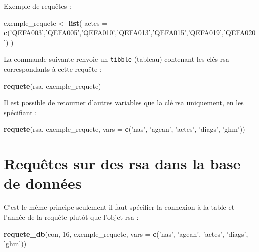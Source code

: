 \documentclass[]{book}
\newenvironment{Shaded}{\begin{snugshade}}{\end{snugshade}}
\newcommand{\DataTypeTok}[1]{\textcolor[rgb]{0.13,0.29,0.53}{#1}}
\newcommand{\DecValTok}[1]{\textcolor[rgb]{0.00,0.00,0.81}{#1}}
\newcommand{\KeywordTok}[1]{\textcolor[rgb]{0.13,0.29,0.53}{\textbf{#1}}}
\newcommand{\NormalTok}[1]{#1}
\newcommand{\StringTok}[1]{\textcolor[rgb]{0.31,0.60,0.02}{#1}}
\begin{document}
Exemple de requêtes :

\begin{Shaded}
\begin{Highlighting}[]
\NormalTok{exemple_requete <-}\StringTok{ }\KeywordTok{list}\NormalTok{(}
  \DataTypeTok{actes =} \KeywordTok{c}\NormalTok{(}\StringTok{'QEFA003'}\NormalTok{,}\StringTok{'QEFA005'}\NormalTok{,}\StringTok{'QEFA010'}\NormalTok{,}\StringTok{'QEFA013'}\NormalTok{,}\StringTok{'QEFA015'}\NormalTok{,}\StringTok{'QEFA019'}\NormalTok{,}\StringTok{'QEFA020'}\NormalTok{)}
\NormalTok{)}
\end{Highlighting}
\end{Shaded}

La commande suivante renvoie un \texttt{tibble} (tableau) contenant les clés rsa correspondants à cette requête :

\begin{Shaded}
\begin{Highlighting}[]
\KeywordTok{requete}\NormalTok{(rsa, exemple_requete)}
\end{Highlighting}
\end{Shaded}

Il est possible de retourner d'autres variables que la clé rsa uniquement, en les spécifiant :

\begin{Shaded}
\begin{Highlighting}[]
\KeywordTok{requete}\NormalTok{(rsa, exemple_requete, }\DataTypeTok{vars =} \KeywordTok{c}\NormalTok{(}\StringTok{'nas'}\NormalTok{, }\StringTok{'agean'}\NormalTok{, }\StringTok{'actes'}\NormalTok{, }\StringTok{'diags'}\NormalTok{, }\StringTok{'ghm'}\NormalTok{))}
\end{Highlighting}
\end{Shaded}

\hypertarget{requetes-sur-des-rsa-dans-la-base-de-donnees}{%
\section{Requêtes sur des rsa dans la base de données}\label{requetes-sur-des-rsa-dans-la-base-de-donnees}}

C'est le même principe seulement il faut spécifier la connexion à la table et l'année de la requête plutôt que l'objet rsa :

\begin{Shaded}
\begin{Highlighting}[]
\KeywordTok{requete_db}\NormalTok{(con, }\DecValTok{16}\NormalTok{, exemple_requete, }\DataTypeTok{vars =} \KeywordTok{c}\NormalTok{(}\StringTok{'nas'}\NormalTok{, }\StringTok{'agean'}\NormalTok{, }\StringTok{'actes'}\NormalTok{, }\StringTok{'diags'}\NormalTok{, }\StringTok{'ghm'}\NormalTok{))}
\end{Highlighting}
\end{Shaded}
\end{document}
